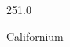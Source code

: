 \documentclass[12pt]{article}
\begin{document}
\hfill{}
\vfill
\begin{center}
  {\fontsize{50}{60}
  }

  251.0

Californium
\end{center}
\vfill
\end{document}
